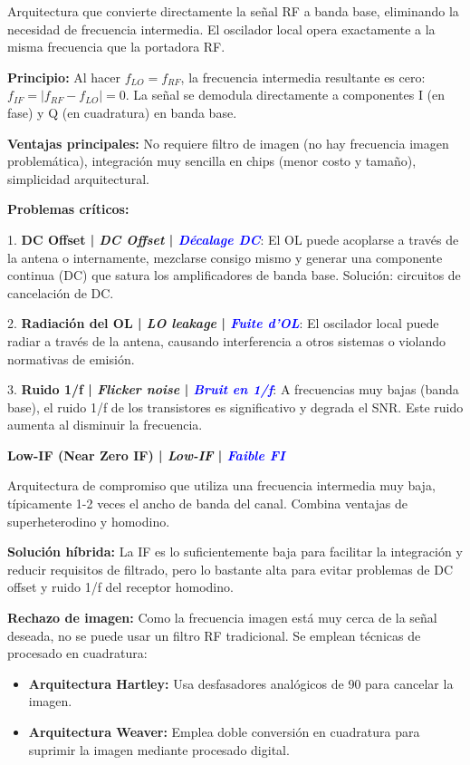 \documentclass[a4paper,10pt]{article}
\begin{document}
Arquitectura que convierte directamente la se\~nal RF a banda base, eliminando la necesidad de frecuencia intermedia. El oscilador local opera exactamente a la misma frecuencia que la portadora RF.

\textbf{Principio:} Al hacer $f_{LO} = f_{RF}$, la frecuencia intermedia resultante es cero: $f_{IF} = |f_{RF} - f_{LO}| = 0$. La se\~nal se demodula directamente a componentes I (en fase) y Q (en cuadratura) en banda base.

\textbf{Ventajas principales:} No requiere filtro de imagen (no hay frecuencia imagen problem\'atica), integraci\'on muy sencilla en chips (menor costo y tama\~no), simplicidad arquitectural.

\textbf{Problemas cr\'iticos:}

1. \textbf{DC Offset | \textit{DC Offset} | \textcolor{blue}{\textit{D\'ecalage DC}}}: El OL puede acoplarse a trav\'es de la antena o internamente, mezclarse consigo mismo y generar una componente continua (DC) que satura los amplificadores de banda base. Soluci\'on: circuitos de cancelaci\'on de DC.

2. \textbf{Radiaci\'on del OL | \textit{LO leakage} | \textcolor{blue}{\textit{Fuite d'OL}}}: El oscilador local puede radiar a trav\'es de la antena, causando interferencia a otros sistemas o violando normativas de emisi\'on.

3. \textbf{Ruido 1/f | \textit{Flicker noise} | \textcolor{blue}{\textit{Bruit en 1/f}}}: A frecuencias muy bajas (banda base), el ruido 1/f de los transistores es significativo y degrada el SNR. Este ruido aumenta al disminuir la frecuencia.

\textbf{Low-IF (Near Zero IF) | \textit{Low-IF} | \textcolor{blue}{\textit{Faible FI}}}

Arquitectura de compromiso que utiliza una frecuencia intermedia muy baja, t\'ipicamente 1-2 veces el ancho de banda del canal. Combina ventajas de superheterodino y homodino.

\textbf{Soluci\'on h\'ibrida:} La IF es lo suficientemente baja para facilitar la integraci\'on y reducir requisitos de filtrado, pero lo bastante alta para evitar problemas de DC offset y ruido 1/f del receptor homodino.

\textbf{Rechazo de imagen:} Como la frecuencia imagen est\'a muy cerca de la se\~nal deseada, no se puede usar un filtro RF tradicional. Se emplean t\'ecnicas de procesado en cuadratura:
\begin{itemize}[leftmargin=*]
    \item \textbf{Arquitectura Hartley:} Usa desfasadores anal\'ogicos de 90\textdegree{} para cancelar la imagen.
    \item \textbf{Arquitectura Weaver:} Emplea doble conversi\'on en cuadratura para suprimir la imagen mediante procesado digital.
\end{itemize}
\end{document}
